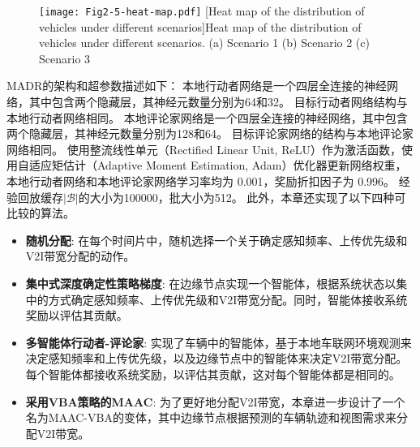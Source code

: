 \begin{figure}[h]
\centering
  \texttt{[image: Fig2-5-heat-map.pdf]}
  [Heat map of the distribution of vehicles under different scenarios]{Heat map of the distribution of vehicles under different scenarios. (a) Scenario 1 (b) Scenario 2 (c) Scenario 3}
  \label{fig 2-5}
\end{figure} 

MADR的架构和超参数描述如下：
本地行动者网络是一个四层全连接的神经网络，其中包含两个隐藏层，其神经元数量分别为64和32。
目标行动者网络结构与本地行动者网络相同。
本地评论家网络是一个四层全连接的神经网络，其中包含两个隐藏层，其神经元数量分别为128和64。
目标评论家网络的结构与本地评论家网络相同。
使用整流线性单元（Rectified Linear Unit, ReLU）作为激活函数，使用自适应矩估计（Adaptive Moment Estimation, Adam）优化器更新网络权重，本地行动者网络和本地评论家网络学习率均为 0.001，奖励折扣因子为 0.996。
经验回放缓存$|\mathcal{B}|$的大小为100000，批大小为512。
此外，本章还实现了以下四种可比较的算法。

\begin{itemize}
	\item \textbf{随机分配}: 在每个时间片中，随机选择一个关于确定感知频率、上传优先级和V2I带宽分配的动作。
	\item \textbf{集中式深度确定性策略梯度}\cite{mlika2022deep}: 在边缘节点实现一个智能体，根据系统状态以集中的方式确定感知频率、上传优先级和V2I带宽分配。同时，智能体接收系统奖励以评估其贡献。
	\item \textbf{多智能体行动者-评论家}\cite{he2021efficient}: 实现了车辆中的智能体，基于本地车联网环境观测来决定感知频率和上传优先级，以及边缘节点中的智能体来决定V2I带宽分配。每个智能体都接收系统奖励，以评估其贡献，这对每个智能体都是相同的。
	\item \textbf{采用VBA策略的MAAC}: 为了更好地分配V2I带宽，本章进一步设计了一个名为MAAC-VBA的变体，其中边缘节点根据预测的车辆轨迹和视图需求来分配V2I带宽。
\end{itemize}


